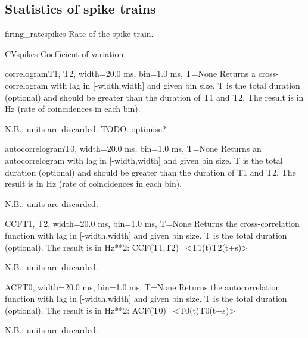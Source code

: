 \documentclass[letterpaper,10pt,english]{manual}
\begin{document}
\subsection{Statistics of spike trains}

\hypertarget{brian.firing_rate}{}\begin{funcdesc}{firing\_rate}{spikes}
Rate of the spike train.
\end{funcdesc}

\hypertarget{brian.CV}{}\begin{funcdesc}{CV}{spikes}
Coefficient of variation.
\end{funcdesc}

\hypertarget{brian.correlogram}{}\begin{funcdesc}{correlogram}{T1, T2, width=20.0 ms, bin=1.0 ms, T=None}
Returns a cross-correlogram with lag in {[}-width,width{]} and given bin size.
T is the total duration (optional) and should be greater than the duration of T1 and T2.
The result is in Hz (rate of coincidences in each bin).

N.B.: units are discarded.
TODO: optimise?
\end{funcdesc}

\hypertarget{brian.autocorrelogram}{}\begin{funcdesc}{autocorrelogram}{T0, width=20.0 ms, bin=1.0 ms, T=None}
Returns an autocorrelogram with lag in {[}-width,width{]} and given bin size.
T is the total duration (optional) and should be greater than the duration of T1 and T2.
The result is in Hz (rate of coincidences in each bin).

N.B.: units are discarded.
\end{funcdesc}

\hypertarget{brian.CCF}{}\begin{funcdesc}{CCF}{T1, T2, width=20.0 ms, bin=1.0 ms, T=None}
Returns the cross-correlation function with lag in {[}-width,width{]} and given bin size.
T is the total duration (optional).
The result is in Hz**2:
CCF(T1,T2)=\textless{}T1(t)T2(t+s)\textgreater{}

N.B.: units are discarded.
\end{funcdesc}

\hypertarget{brian.ACF}{}\begin{funcdesc}{ACF}{T0, width=20.0 ms, bin=1.0 ms, T=None}
Returns the autocorrelation function with lag in {[}-width,width{]} and given bin size.
T is the total duration (optional).
The result is in Hz**2:
ACF(T0)=\textless{}T0(t)T0(t+s)\textgreater{}

N.B.: units are discarded.
\end{funcdesc}
\end{document}
